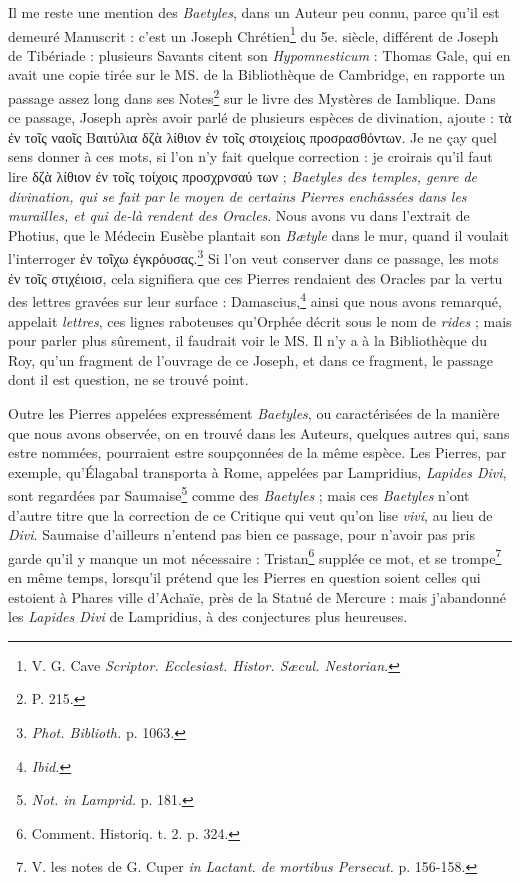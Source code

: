 \documentclass[a4paper, 11pt, oneside, polutonikogreek, french]{article}
\begin{document}
Il me reste une mention des \emph{Baetyles}, dans un Auteur peu connu, parce qu'il est demeuré Manuscrit : c'est un Joseph Chrétien\footnote{V. G. Cave \emph{Scriptor. Ecclesiast. Histor. Sæcul. Nestorian.}} du 5e. siècle, différent de Joseph de Tibériade : plusieurs Savants citent son \emph{Hypomnesticum} : Thomas Gale, qui en avait une copie tirée sur le MS. de la Bibliothèque de Cambridge, en rapporte un passage assez long dans ses Notes\footnote{P. 215.} sur le livre des Mystères de Iamblique. Dans ce passage, Joseph après avoir parlé de plusieurs espèces de divination, ajoute : τὰ ἐν τοῖς ναοῖς Βαιτύλια δζὰ λίθιον ἐν τοῖς στοιχείοις προσρασθόντων. Je ne çay quel sens donner à ces mots, si l'on n'y fait quelque correction : je croirais qu'il faut lire δζὰ λίθιον ἐν τοῖς τοίχοις προσχρνσαύ των ; \emph{Baetyles des temples, genre de divination, qui se fait par le moyen de certains Pierres enchâssées dans les murailles, et qui de-là rendent des Oracles}. Nous avons vu dans l'extrait de Photius, que le Médecin Eusèbe plantait son \emph{Bætyle} dans le mur, quand il voulait l'interroger ἐν τοῖχω ἐγκρόυσας.\footnote{\emph{Phot. Biblioth.} p. 1063.} Si l'on veut conserver dans ce passage, les mots ἐν τοῖς στιχέιοισ, cela signifiera que ces Pierres rendaient des Oracles par la vertu des lettres gravées sur leur surface : Damascius,\footnote{\emph{Ibid.}} ainsi que nous avons remarqué, appelait \emph{lettres}, ces lignes raboteuses qu'Orphée décrit sous le nom de \emph{rides} ; mais pour parler plus sûrement, il faudrait voir le MS. Il n'y a à la Bibliothèque du Roy, qu'un fragment de l'ouvrage de ce Joseph, et dans ce fragment, le passage dont il est question, ne se trouvé point.

Outre les Pierres appelées expressément \emph{Baetyles}, ou caractérisées de la manière que nous avons observée, on en trouvé dans les Auteurs, quelques autres qui, sans estre nommées, pourraient estre soupçonnées de la même espèce. Les Pierres, par exemple, qu'Élagabal transporta à Rome, appelées par Lampridius, \emph{Lapides Divi}, sont regardées par Saumaise\footnote{\emph{Not. in Lamprid.} p. 181.} comme des \emph{Baetyles} ; mais ces \emph{Baetyles} n'ont d'autre titre que la correction de ce Critique qui veut qu'on lise \emph{vivi}, au lieu de \emph{Divi}. Saumaise d'ailleurs n'entend pas bien ce passage, pour n'avoir pas pris garde qu'il y manque un mot nécessaire : Tristan\footnote{Comment. Historiq. t. 2. p. 324.} supplée ce mot, et se trompe\footnote{V. les notes de G. Cuper \emph{in Lactant. de mortibus Persecut.} p. 156-158.} en même temps, lorsqu'il prétend que les Pierres en question soient celles qui estoient à Phares ville d'Achaïe, près de la Statué de Mercure : mais j'abandonné les \emph{Lapides Divi} de Lampridius, à des conjectures plus heureuses.
\end{document}
